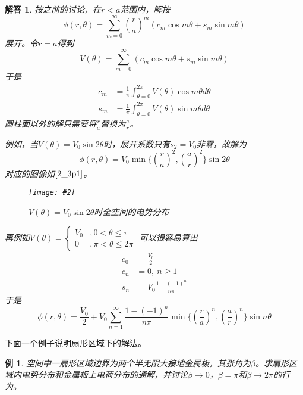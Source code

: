 \documentclass[a4paper,11pt]{ctexbook}
\newcommand{\cpic}[2]{
\begin{center}
\texttt{[image: \#2]}
\end{center}
}
\newcommand{\cpicn}[3]
{
\begin{figure}[H]
\cpic{#1}{#2}
\caption{#3\label{#2}}
\end{figure}
}
\newtheorem{eg}{例}[section]
\newtheorem{ans}{解答}[section]
\newcommand{\beq}{\begin{equation}}
\newcommand{\eeq}{\end{equation}}
\newcommand{\bea}{\begin{equation}\begin{aligned}}
\newcommand{\eea}{\end{aligned}\end{equation}}
\begin{document}
\begin{ans}
按之前的讨论，在$r<a$范围内，解按
\beq
\phi(r,\theta) = \sum_{m=0}^\infty \left( \frac{r}{a} \right)^m \left( c_m \cos m \theta + s_m \sin m \theta \right)
\eeq
展开。令$r=a$得到
\beq
V(\theta) = \sum_{m=0}^\infty  \left( c_m \cos m \theta + s_m \sin m \theta \right)
\eeq
于是
\bea
c_m &= \frac{1}{\pi} \int_{\theta=0}^{2\pi} V(\theta) \cos m \theta d\theta \\
s_m &= \frac{1}{\pi} \int_{\theta=0}^{2\pi} V(\theta) \sin m \theta d\theta
\eea
圆柱面以外的解只需要将$\frac{r}{a}$替换为$\frac{a}{r}$。
\par
例如，当$V(\theta) = V_0 \sin 2\theta$时，展开系数只有$s_2 = V_0$非零，故解为
\beq
\phi(r,\theta) = V_0 \min \{ \left( \frac{r}{a}\right)^2 ,\left( \frac{a}{r} \right)^2\}  \sin 2\theta
\eeq
对应的图像如$\cref{2_3p1}$。
\cpicn{0.12}{2_3p1}{$V(\theta) = V_0 \sin 2\theta$时全空间的电势分布}
\par
再例如$V(\theta) = \begin{cases}
V_0 &, 0<\theta \leq \pi \\
0 &, \pi <\theta \leq 2\pi
\end{cases}$
可以很容易算出
\bea
c_0 &= \frac{V_0}{2}\\
c_n&=0,\ n \geq 1 \\
s_n &= V_0\frac{1 - (-1)^n}{n\pi}
\eea
于是
\beq
\phi(r,\theta) = \frac{V_0}{2}+V_0 \sum_{n=1}^\infty  \frac{1 - (-1)^n}{n\pi} \min \{ \left(\frac{r}{a}\right)^n , \left(\frac{a}{r} \right)^n \} \sin n \theta
\eeq

\end{ans}
\par
下面一个例子说明扇形区域下的解法。
\begin{eg}
空间中一扇形区域边界为两个半无限大接地金属板，其张角为$\beta$。求扇形区域内电势分布和金属板上电荷分布的通解，并讨论$\beta \to 0$，$\beta = \pi$和$\beta \to 2\pi$的行为。
\end{eg}
\end{document}
